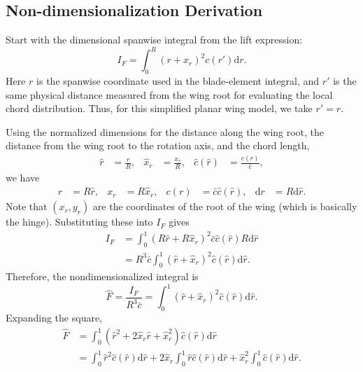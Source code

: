 \documentclass{article}
\newcommand{\D}{\mathrm{d}}
\begin{document}
\subsection{Non-dimensionalization Derivation} 
\label{sec:non_dimensionalization_derivation} 
Start with the dimensional spanwise integral from the lift expression:
\begin{equation}
    I_F = \int_0^R (r + x_r)^2 c(r') \D r.
\end{equation}
Here \(r\) is the spanwise coordinate used in the blade-element integral, and
\(r'\) is the same physical distance measured from the wing root for evaluating
the local chord distribution. Thus, for this simplified planar wing model, we
take \(r' = r\).

Using the normalized dimensions for the distance along the wing root, the distance from the wing root to the rotation axis, and the chord length, 
\begin{align}
    \hat{r} &= \frac{r}{R}, &
    \hat{x}_r &= \frac{x_r}{R}, &
    \hat{c}(\hat{r}) &= \frac{c(r)}{\bar{c}},
\end{align}
we have
\begin{align}
    r &= R\hat{r}, &
    x_r &= R\hat{x}_r, &
    c(r) &= \bar{c}\hat{c}(\hat{r}), &
    \D r &= R \D \hat{r}.
\end{align}
Note that \((x_r, y_r)\) are the coordinates of the root of the wing (which is basically the hinge). Substituting these into \(I_F\) gives
\begin{align}
    I_F
        &= \int_0^1
           \left(R\hat{r} + R\hat{x}_r\right)^2
           \bar{c}\hat{c}(\hat{r})
           R \D \hat{r} \\
        &= R^3\bar{c}
           \int_0^1
           \left(\hat{r} + \hat{x}_r\right)^2
           \hat{c}(\hat{r}) \D \hat{r}.
\end{align}
Therefore, the nondimensionalized integral is
\begin{equation}
    \hat{F}
        = \frac{I_F}{R^3\bar{c}}
        = \int_0^1
          \left(\hat{r} + \hat{x}_r\right)^2
          \hat{c}(\hat{r}) \D \hat{r}.
\end{equation}
Expanding the square,
\begin{align}
    \hat{F}
        &= \int_0^1
           \left(\hat{r}^2
           + 2\hat{x}_r\hat{r}
           + \hat{x}_r^2\right)
           \hat{c}(\hat{r}) \D \hat{r} \\
        &= \int_0^1 \hat{r}^2\hat{c}(\hat{r}) \D \hat{r}
           + 2\hat{x}_r
             \int_0^1 \hat{r}\hat{c}(\hat{r}) \D \hat{r}
           + \hat{x}_r^2
             \int_0^1 \hat{c}(\hat{r}) \D \hat{r}.
\end{align}
\end{document}
